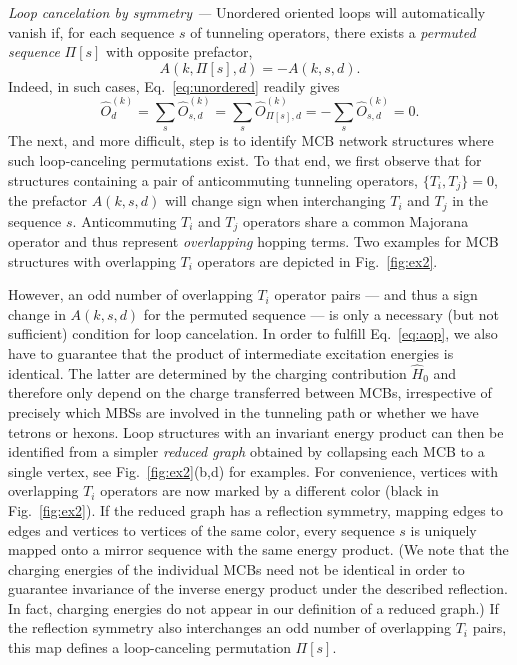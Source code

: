 \documentclass[twocolumn,floats,prx,showpacs]{revtex4-1}
\begin{document}
\emph{Loop cancelation by symmetry ---}
Unordered oriented loops will automatically vanish if, for each sequence $s$ of tunneling operators, there exists a \emph{permuted sequence} $\Pi[s]$ with opposite prefactor, 
\begin{equation}\label{eq:aop}
A(k, \Pi[s],d) = -A(k,s,d).
\end{equation}
Indeed, in such  cases, Eq.~\eqref{eq:unordered} readily gives  
\begin{equation}
\hat O^{(k)}_d=\sum_{s} \hat O^{(k)}_{s,d}  = 
\sum_{s} \hat O^{(k)}_{\Pi[s],d} = - \sum_{s} \hat O^{(k)}_{s,d} = 0.
\end{equation} 
The next, and more difficult, step is to identify MCB network structures where such loop-canceling permutations exist. To that end, we first observe that for structures containing a pair of anticommuting tunneling operators, $\{ T_i, T_j\}=0$, the prefactor $A(k,s,d)$ will change sign when interchanging $T_i$ and $T_j$ in the sequence $s$.   
Anticommuting $T_i$ and $T_j$ operators share a common Majorana operator and thus represent \emph{overlapping} hopping terms. Two examples for MCB structures with overlapping $T_i$ operators are depicted in Fig.~\ref{fig:ex2}. 

However, an odd number of overlapping $T_i$ operator pairs --- and thus a sign change in $A(k,s,d)$ for the 
permuted sequence --- is only a necessary (but not sufficient) condition for loop cancelation.  
In order to fulfill Eq.~\eqref{eq:aop}, we also have to guarantee that the product of intermediate excitation
energies is identical.  The latter are determined by the charging contribution $\hat H_0$
and therefore only depend on the charge transferred between MCBs, irrespective of precisely which 
MBSs are involved in the tunneling path or whether we have tetrons or hexons. 
Loop structures with an invariant energy product can then be identified 
from a simpler \emph{reduced graph} obtained by collapsing each MCB to a single vertex, 
see Fig.~\ref{fig:ex2}(b,d) for examples.
For convenience, vertices with overlapping $T_i$ operators are now marked by a different color (black in Fig.~\ref{fig:ex2}). If the reduced graph has a reflection symmetry, 
mapping edges to edges and vertices to vertices of the same color, 
every sequence $s$ is uniquely mapped onto a mirror sequence with the same energy product. (We  note that the charging energies of the individual MCBs need not be identical in order to guarantee invariance of the inverse energy product under the described reflection.  In fact, charging energies do not appear in our definition of a reduced graph.)  
If the reflection symmetry also interchanges an odd number of overlapping $T_i$ pairs,
this map defines a loop-canceling permutation $\Pi[s]$. 
\end{document}
